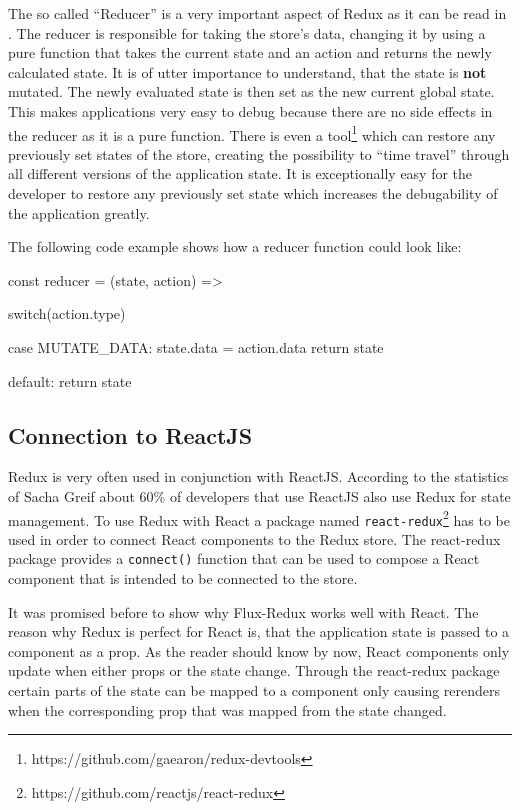 The so called \enquote{Reducer} is a very important aspect of Redux as it can be read in \cite[Reducers]{DanAbramov.2015}. The reducer is responsible for taking the store's data, changing it by using a pure function that takes the current state and an action and returns the newly calculated state. It is of utter importance to understand, that the state is \textbf{not} mutated. The newly evaluated state is then set as the new current global state. This makes applications very easy to debug because there are no side effects in the reducer as it is a pure function. There is even a tool\footnote{https://github.com/gaearon/redux-devtools} which can restore any previously set states of the store, creating the possibility to \enquote{time travel} through all different versions of the application state. It is exceptionally easy for the developer to restore any previously set state which increases the debugability of the application greatly.

The following code example shows how a reducer function could look like:

\begin{JsCode}
const reducer = (state, action) => {
  switch(action.type) {
  	
    case MUTATE_DATA:
      state.data = action.data
      return state
  
    default: 
      return state
  }
}
\end{JsCode}


\subsection{Connection to ReactJS}

Redux is very often used in conjunction with ReactJS. According to the statistics of Sacha Greif \cite[Front-End Frameworks]{SachaGreif.2016} about 60\% of developers that use ReactJS also use Redux for state management. To use Redux with React a package named \texttt{react-redux}\footnote{https://github.com/reactjs/react-redux} has to be used in order to connect React components to the Redux store. The react-redux package provides a \texttt{connect()} function that can be used to compose a React component that is intended to be connected to the store.

It was promised before to show why Flux-Redux works well with React. The reason why Redux is perfect for React is, that the application state is passed to a component as a prop. As the reader should know by now, React components only update when either props or the state change. Through the react-redux package certain parts of the state can be mapped to a component only causing rerenders when the corresponding prop that was mapped from the state changed.

